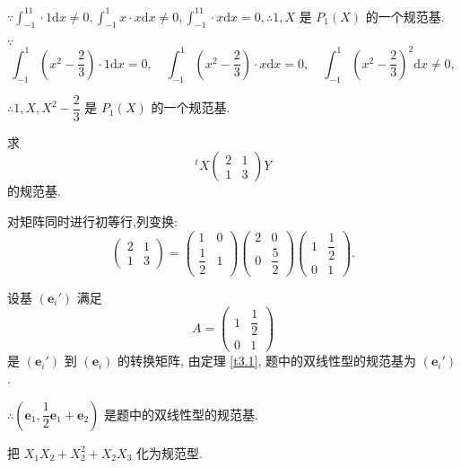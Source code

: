 \documentclass{ctexart}
\begin{document}
\begin{solution}
    $\because\int_{-1}^11\cdot 1\mathrm{d}x\neq0,\int_{-1}^1x\cdot x\mathrm{d}x\neq0,\int_{-1}^11\cdot x\mathrm{d}x=0,\therefore1,X$ 是 $P_1(X)$ 的一个规范基.

    $\because$
    \[\int_{-1}^1\left(x^2-\dfrac{2}{3}\right)\cdot 1\mathrm{d}x=0,\quad\int_{-1}^1\left(x^2-\dfrac{2}{3}\right)\cdot x\mathrm{d}x=0,\quad\int_{-1}^1\left(x^2-\dfrac{2}{3}\right)^2\mathrm{d}x\neq0,\]

    $\therefore1,X,X^2-\dfrac{2}{3}$ 是 $P_1(X)$ 的一个规范基.
\end{solution}
\begin{exercisec}\label{exc3}
    求
    \[^tX\begin{pmatrix}
        2 & 1 \\
        1 & 3
    \end{pmatrix}Y\]
    的规范基.
\end{exercisec}
\begin{solution}
    对矩阵同时进行初等行,列变换:
    \[\begin{pmatrix}
            2 & 1 \\
            1 & 3
        \end{pmatrix}=\begin{pmatrix}
            1 & 0 \\
            \dfrac{1}{2} & 1
        \end{pmatrix}\begin{pmatrix}
            2 & 0 \\
            0 & \dfrac{5}{2}
        \end{pmatrix}\begin{pmatrix}
            1 & \dfrac{1}{2} \\
            0 & 1
        \end{pmatrix}.\]

        设基 $(\boldsymbol{e}_i')$ 满足
        \[A=\begin{pmatrix}
            1 & \dfrac{1}{2} \\
            0 & 1
        \end{pmatrix}\]
        是 $(\boldsymbol{e}_i')$ 到 $(\boldsymbol{e}_i)$ 的转换矩阵, 由定理 \ref{t3.1}, 题中的双线性型的规范基为 $(\boldsymbol{e}_i')$.

        $\therefore\left(\boldsymbol{e}_1,\dfrac{1}{2}\boldsymbol{e}_1+\boldsymbol{e}_2\right)$ 是题中的双线性型的规范基.
\end{solution}
\begin{exercisec}%
    把 $X_1X_2+X_2^2+X_2X_3$ 化为规范型.
\end{exercisec}
\end{document}
